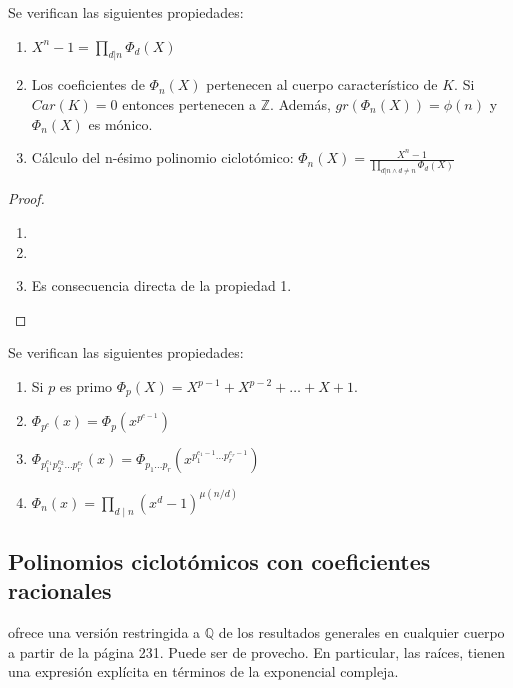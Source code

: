 \begin{proposition}
Se verifican las siguientes propiedades:

\begin{enumerate}
\item $X^n - 1 = \prod_{d|n} \Phi_d(X)$
\item Los coeficientes de $\Phi_n(X)$ pertenecen al cuerpo característico de $K$. Si $Car(K) = 0$ entonces pertenecen a $\mathbb{Z}$. Además, $gr(\Phi_n(X)) = \phi(n)$ y $\Phi_n(X)$ es mónico. 
\item Cálculo del n-ésimo polinomio ciclotómico: $\Phi_n(X) = \frac{X^n - 1}{\prod_{d|n \land d \neq n} \Phi_d(X)}$ 
\end{enumerate}
\end{proposition}
\begin{proof}
\begin{enumerate}
\item 
\item 
\item Es consecuencia directa de la propiedad 1. 
\end{enumerate}
\end{proof}

\begin{proposition}
Se verifican las siguientes propiedades:

\begin{enumerate}
\item Si $p$ es primo $\Phi_p(X) = X^{p-1} + X^{p-2} + \dots + X + 1$.
\item $\Phi_{p^e}(x) = \Phi_p(x^{p^{e-1}})$
\item $\Phi_{p_1^{e_1}p_2^{e_2}\dots p_r^{e_r}}(x) = \Phi_{p_1\dots p_r}(x^{p_1^{e_1-1}\dots p_r^{e_r-1}})$
\item $\Phi_n(x) = \prod_{d\mid n} (x^{d}-1)^{\mu(n/d)}$
\end{enumerate}
\end{proposition}

\subsection{Polinomios ciclotómicos con coeficientes racionales}

\cite{cox} ofrece una versión restringida a $\mathbb{Q}$ de los resultados generales en cualquier cuerpo a partir de la página 231. Puede ser de provecho. En particular, las raíces, tienen una expresión explícita en términos de la exponencial compleja. 

